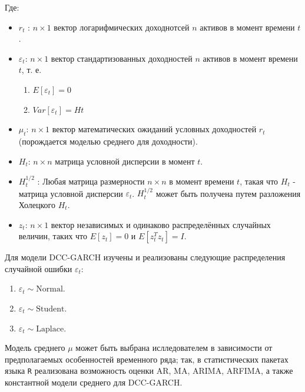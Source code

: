 \documentclass[a4paper,12pt,twoside]{article}
\begin{document}
Где:
\begin{itemize}
    \item $r_t$ : $n \times 1$ вектор логарифмических доходнотсей $n$ активов в момент времени $t$.
    \item $\varepsilon_t$: $n \times 1$ вектор стандартизованных доходностей $n$ активов в момент времени $t$, т. е.
          \begin{enumerate}
                \item $E[\varepsilon_t]=0$
                \item $Var[\varepsilon_t] = Ht$
          \end{enumerate}
    \item $\mu_t$: $n \times 1$ вектор математических ожиданий условных доходностей $r_t$ (порождается моделью среднего для доходности).
    \item $H_t$: $n \times n$ матрица условной дисперсии в момент $t$.
    \item $H^{1/2}_t$ : Любая матрица размерности $n \times n$ в момент времени $t$, такая что $H_t$ - матрица условной дисперсии $\varepsilon_t$. $H^{1/2}_t$ может быть получена путем разложения Холецкого $H_t$.
    \item $z_t$: $n \times 1$ вектор независимых и одинаково распределённых случайных величин, таких что $E[z_t]=0$ и $E[z^{T}_t z_t] = I$.
\end{itemize}

Для модели DCC-GARCH изучены и реализованы следующие распределения случайной ошибки $\varepsilon_t$:

\begin{enumerate}
    \item $\varepsilon_t \sim \mathrm{Normal}$.
    \item $\varepsilon_t \sim \mathrm{Student}$.
    \item $\varepsilon_t \sim \mathrm{Laplace}$.
\end{enumerate}

Модель среднего $\mu$ может быть выбрана ислледователем в зависимости от предполагаемых особенностей временного ряда; так, в статистических пакетах языка \texttt{R} реализована возможность оценки AR, MA, ARIMA, ARFIMA, а также константной модели среднего для DCC-GARCH.
\end{document}
